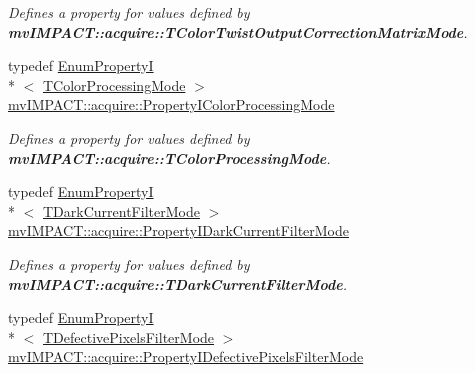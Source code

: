 \begin{DoxyCompactItemize}
\begin{DoxyCompactList}\small\item\em Defines a property for values defined by {\bfseries mv\+I\+M\+P\+A\+C\+T\+::acquire\+::\+T\+Color\+Twist\+Output\+Correction\+Matrix\+Mode}. \end{DoxyCompactList}\item 
\hypertarget{group___common_interface_gafa56b00b5309b5cb40e10b9eb07e1cf9}{typedef \hyperlink{classmv_i_m_p_a_c_t_1_1acquire_1_1_enum_property_i}{Enum\+Property\+I}\\*
$<$ \hyperlink{group___common_interface_ga906258e7f7e29527fd5edf23f03a7adb}{T\+Color\+Processing\+Mode} $>$ \hyperlink{group___common_interface_gafa56b00b5309b5cb40e10b9eb07e1cf9}{mv\+I\+M\+P\+A\+C\+T\+::acquire\+::\+Property\+I\+Color\+Processing\+Mode}}\label{group___common_interface_gafa56b00b5309b5cb40e10b9eb07e1cf9}

\begin{DoxyCompactList}\small\item\em Defines a property for values defined by {\bfseries mv\+I\+M\+P\+A\+C\+T\+::acquire\+::\+T\+Color\+Processing\+Mode}. \end{DoxyCompactList}\item 
\hypertarget{group___common_interface_gade29cf3422c28d48e5d6c20cd9f47f1e}{typedef \hyperlink{classmv_i_m_p_a_c_t_1_1acquire_1_1_enum_property_i}{Enum\+Property\+I}\\*
$<$ \hyperlink{group___common_interface_ga529300ca9481f6773a3a6f7d360191ed}{T\+Dark\+Current\+Filter\+Mode} $>$ \hyperlink{group___common_interface_gade29cf3422c28d48e5d6c20cd9f47f1e}{mv\+I\+M\+P\+A\+C\+T\+::acquire\+::\+Property\+I\+Dark\+Current\+Filter\+Mode}}\label{group___common_interface_gade29cf3422c28d48e5d6c20cd9f47f1e}

\begin{DoxyCompactList}\small\item\em Defines a property for values defined by {\bfseries mv\+I\+M\+P\+A\+C\+T\+::acquire\+::\+T\+Dark\+Current\+Filter\+Mode}. \end{DoxyCompactList}\item 
\hypertarget{group___common_interface_ga1833e6534b35ce9f81fdc3a80cc332d3}{typedef \hyperlink{classmv_i_m_p_a_c_t_1_1acquire_1_1_enum_property_i}{Enum\+Property\+I}\\*
$<$ \hyperlink{group___common_interface_ga026aca333783574cb87c7cd7bebfc2fd}{T\+Defective\+Pixels\+Filter\+Mode} $>$ \hyperlink{group___common_interface_ga1833e6534b35ce9f81fdc3a80cc332d3}{mv\+I\+M\+P\+A\+C\+T\+::acquire\+::\+Property\+I\+Defective\+Pixels\+Filter\+Mode}}\label{group___common_interface_ga1833e6534b35ce9f81fdc3a80cc332d3}


\end{DoxyCompactItemize}
